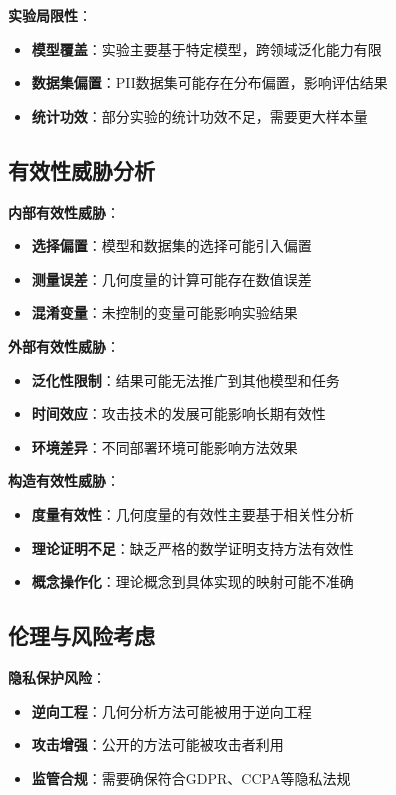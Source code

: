 \textbf{实验局限性}：
\begin{itemize}
\item \textbf{模型覆盖}：实验主要基于特定模型，跨领域泛化能力有限
\item \textbf{数据集偏置}：PII数据集可能存在分布偏置，影响评估结果
\item \textbf{统计功效}：部分实验的统计功效不足，需要更大样本量
\end{itemize}

\subsection{有效性威胁分析}

\textbf{内部有效性威胁}：
\begin{itemize}
\item \textbf{选择偏置}：模型和数据集的选择可能引入偏置
\item \textbf{测量误差}：几何度量的计算可能存在数值误差
\item \textbf{混淆变量}：未控制的变量可能影响实验结果
\end{itemize}

\textbf{外部有效性威胁}：
\begin{itemize}
\item \textbf{泛化性限制}：结果可能无法推广到其他模型和任务
\item \textbf{时间效应}：攻击技术的发展可能影响长期有效性
\item \textbf{环境差异}：不同部署环境可能影响方法效果
\end{itemize}

\textbf{构造有效性威胁}：
\begin{itemize}
\item \textbf{度量有效性}：几何度量的有效性主要基于相关性分析
\item \textbf{理论证明不足}：缺乏严格的数学证明支持方法有效性
\item \textbf{概念操作化}：理论概念到具体实现的映射可能不准确
\end{itemize}

\subsection{伦理与风险考虑}

\textbf{隐私保护风险}：
\begin{itemize}
\item \textbf{逆向工程}：几何分析方法可能被用于逆向工程
\item \textbf{攻击增强}：公开的方法可能被攻击者利用
\item \textbf{监管合规}：需要确保符合GDPR、CCPA等隐私法规
\end{itemize}

